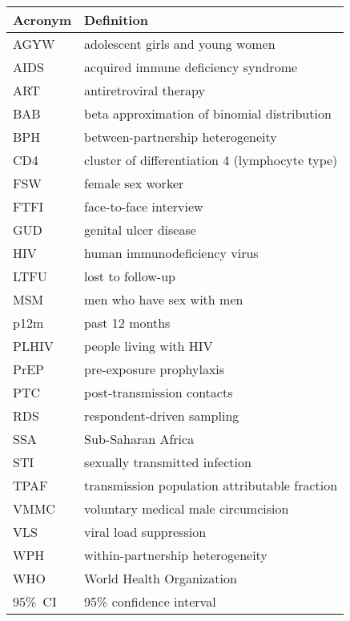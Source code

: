 \begin{tabular}{ll}
  \toprule
  Acronym & Definition \\
  \midrule
  AGYW    & adolescent girls and young women \\
  AIDS    & acquired immune deficiency syndrome \\
  ART     & antiretroviral therapy \\
  BAB     & beta approximation of binomial distribution \\
  BPH     & between-partnership heterogeneity \\
  CD4     & cluster of differentiation 4 (lymphocyte type) \\
  FSW     & female sex worker \\
  FTFI    & face-to-face interview \\
  GUD     & genital ulcer disease \\
  HIV     & human immunodeficiency virus \\
  LTFU    & lost to follow-up \\
  MSM     & men who have sex with men \\
  p12m    & past 12 months \\
  PLHIV   & people living with HIV \\
  PrEP    & pre-exposure prophylaxis \\
  PTC     & post-transmission contacts \\
  RDS     & respondent-driven sampling \\
  SSA     & Sub-Saharan Africa \\
  STI     & sexually transmitted infection \\
  TPAF    & transmission population attributable fraction \\
  VMMC    & voluntary medical male circumcision \\
  VLS     & viral load suppression \\
  WPH     & within-partnership heterogeneity \\
  WHO     & World Health Organization \\
  95\%~CI & 95\% confidence interval \\
  \bottomrule
\end{tabular}